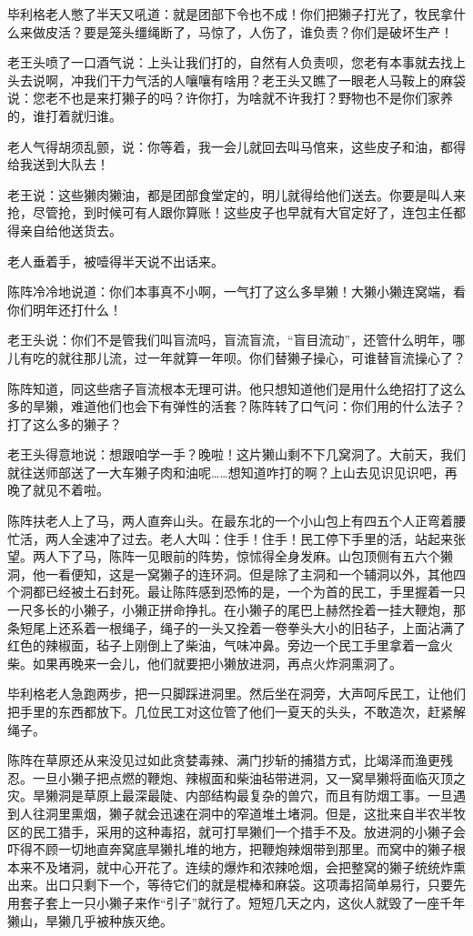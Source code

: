 \par 毕利格老人憋了半天又吼道：就是团部下令也不成！你们把獭子打光了，牧民拿什么来做皮活？要是笼头缰绳断了，马惊了，人伤了，谁负责？你们是破坏生产！
\par 老王头喷了一口酒气说：上头让我们打的，自然有人负责呗，您老有本事就去找上头去说啊，冲我们干力气活的人嚷嚷有啥用？老王头又瞧了一眼老人马鞍上的麻袋说：您老不也是来打獭子的吗？许你打，为啥就不许我打？野物也不是你们家养的，谁打着就归谁。
\par 老人气得胡须乱颤，说：你等着，我一会儿就回去叫马倌来，这些皮子和油，都得给我送到大队去！
\par 老王说：这些獭肉獭油，都是团部食堂定的，明儿就得给他们送去。你要是叫人来抢，尽管抢，到时候可有人跟你算账！这些皮子也早就有大官定好了，连包主任都得亲自给他送货去。
\par 老人垂着手，被噎得半天说不出话来。
\par 陈阵冷冷地说道：你们本事真不小啊，一气打了这么多旱獭！大獭小獭连窝端，看你们明年还打什么！
\par 老王头说：你们不是管我们叫盲流吗，盲流盲流，“盲目流动”，还管什么明年，哪儿有吃的就往那儿流，过一年就算一年呗。你们替獭子操心，可谁替盲流操心了？
\par 陈阵知道，同这些痞子盲流根本无理可讲。他只想知道他们是用什么绝招打了这么多的旱獭，难道他们也会下有弹性的活套？陈阵转了口气问：你们用的什么法子？打了这么多的獭子？
\par 老王头得意地说：想跟咱学一手？晚啦！这片獭山剩不下几窝洞了。大前天，我们就往送师部送了一大车獭子肉和油呢……想知道咋打的啊？上山去见识见识吧，再晚了就见不着啦。
\par 陈阵扶老人上了马，两人直奔山头。在最东北的一个小山包上有四五个人正弯着腰忙活，两人全速冲了过去。老人大叫：住手！住手！民工停下手里的活，站起来张望。两人下了马，陈阵一见眼前的阵势，惊怵得全身发麻。山包顶侧有五六个獭洞，他一看便知，这是一窝獭子的连环洞。但是除了主洞和一个辅洞以外，其他四个洞都已经被土石封死。最让陈阵感到恐怖的是，一个为首的民工，手里握着一只一尺多长的小獭子，小獭正拼命挣扎。在小獭子的尾巴上赫然拴着一挂大鞭炮，那条短尾上还系着一根绳子，绳子的一头又拴着一卷拳头大小的旧毡子，上面沾满了红色的辣椒面，毡子上刚倒上了柴油，气味冲鼻。旁边一个民工手里拿着一盒火柴。如果再晚来一会儿，他们就要把小獭放进洞，再点火炸洞熏洞了。
\par 毕利格老人急跑两步，把一只脚踩进洞里。然后坐在洞旁，大声呵斥民工，让他们把手里的东西都放下。几位民工对这位管了他们一夏天的头头，不敢造次，赶紧解绳子。
\par 陈阵在草原还从来没见过如此贪婪毒辣、满门抄斩的捕猎方式，比竭泽而渔更残忍。一旦小獭子把点燃的鞭炮、辣椒面和柴油毡带进洞，又一窝旱獭将面临灭顶之灾。旱獭洞是草原上最深最陡、内部结构最复杂的兽穴，而且有防烟工事。一旦遇到人往洞里熏烟，獭子就会迅速在洞中的窄道堆土堵洞。但是，这批来自半农半牧区的民工猎手，采用的这种毒招，就可打旱獭们一个措手不及。放进洞的小獭子会吓得不顾一切地直奔窝底旱獭扎堆的地方，把鞭炮辣烟带到那里。而窝中的獭子根本来不及堵洞，就中心开花了。连续的爆炸和浓辣呛烟，会把整窝的獭子统统炸熏出来。出口只剩下一个，等待它们的就是棍棒和麻袋。这项毒招简单易行，只要先用套子套上一只小獭子来作“引子”就行了。短短几天之内，这伙人就毁了一座千年獭山，旱獭几乎被种族灭绝。
